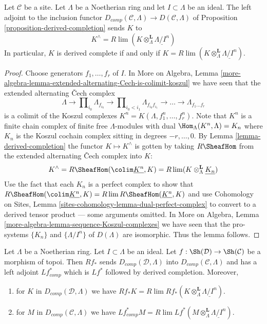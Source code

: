 \begin{lemma}
\label{lemma-naive-completion}
Let $\mathcal{C}$ be a site. Let $\Lambda$ be a Noetherian ring
and let $I \subset \Lambda$ be an ideal. The left adjoint
to the inclusion functor
$D_{comp}(\mathcal{C}, \Lambda) \to D(\mathcal{C}, \Lambda)$
of Proposition \ref{proposition-derived-completion} sends $K$ to
$$
K^\wedge = R\lim(K \otimes_\Lambda^\mathbf{L} \underline{\Lambda/I^n})
$$
In particular, $K$ is derived complete if and only if
$K = R\lim(K \otimes_\Lambda^\mathbf{L} \underline{\Lambda/I^n})$.
\end{lemma}

\begin{proof}
Choose generators $f_1, \ldots, f_r$ of $I$. In
More on Algebra, Lemma
\ref{more-algebra-lemma-extended-alternating-Cech-is-colimit-koszul}
we have seen that the extended alternating {\v C}ech complex
$$
\Lambda \to \prod\nolimits_{i_0} \Lambda_{f_{i_0}} \to
\prod\nolimits_{i_0 < i_1} \Lambda_{f_{i_0}f_{i_1}} \to
\ldots \to \Lambda_{f_1\ldots f_r}
$$
is a colimit of the Koszul complexes $K^n = K(\Lambda, f_1^n, \ldots, f_r^n)$.
Note that $K^n$ is a finite chain complex of finite free $\Lambda$-modules
with dual $\Hom_\Lambda(K^n, \Lambda) = K_n$ where $K_n$ is the Koszul
cochain complex sitting in degrees $-r, \ldots, 0$. By
Lemma \ref{lemma-derived-completion}
the functor $K \mapsto K^\wedge$ is gotten by taking
$R\SheafHom$ from the extended alternating {\v C}ech complex into $K$:
$$
K^\wedge = 
R\SheafHom(\colim \underline{K^n}, K) =
R\lim (K \otimes_\Lambda^\mathbf{L} \underline{K_n})
$$
Use the fact that each $K_n$ is a perfect complex to show that
$R\SheafHom(\colim \underline{K^n}, K) = R\lim R\SheafHom(\underline{K^n}, K)$
and use
Cohomology on Sites, Lemma \ref{sites-cohomology-lemma-dual-perfect-complex}
to convert to a derived tensor product --- some arguments omitted.
In More on Algebra, Lemma \ref{more-algebra-lemma-sequence-Koszul-complexes}
we have seen that the pro-systems $\{K_n\}$ and
$\{\Lambda/I^n\}$ of $D(\Lambda)$
are isomorphic. Thus the lemma follows.
\end{proof}

\begin{lemma}
\label{lemma-pushforward-Noetherian-case}
Let $\Lambda$ be a Noetherian ring. Let $I \subset \Lambda$ be an ideal.
Let $f : \Sh(\mathcal{D}) \to \Sh(\mathcal{C})$ be a morphism of topoi.
Then $Rf_*$ sends $D_{comp}(\mathcal{D}, \Lambda)$
into $D_{comp}(\mathcal{C}, \Lambda)$ and has a left adjoint
$Lf_{comp}^*$ which is $Lf^*$ followed by derived completion.
Moreover,
\begin{enumerate}
\item for $K$ in $D_{comp}(\mathcal{D}, \Lambda)$ we have
$Rf_*K = R\lim Rf_*(K \otimes^\mathbf{L}_\Lambda \underline{\Lambda/I^n})$.
\item for $M$ in $D_{comp}(\mathcal{C}, \Lambda)$ we have
$Lf^*_{comp}M =
R\lim Lf^*(M \otimes^\mathbf{L}_\Lambda \underline{\Lambda/I^n})$.
\end{enumerate}
\end{lemma}

